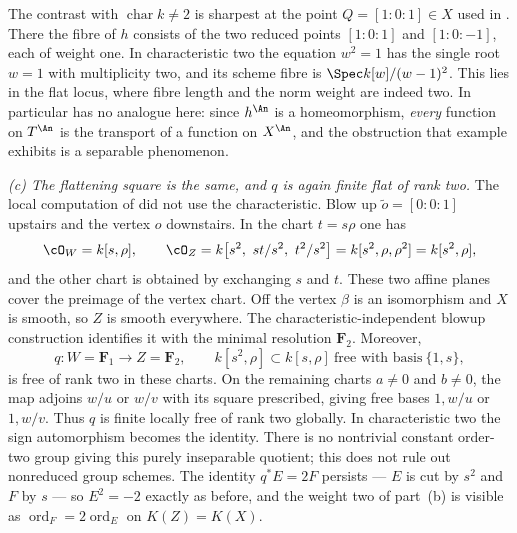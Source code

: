 \begin{example}
The contrast with $\operatorname{char}k\ne2$ is sharpest at the point
$Q=[1:0:1]\in X$ used in .  There the fibre
of $h$ consists of the two reduced points $[1:0:1]$ and $[1:0:-1]$,
each of weight one.  In characteristic two the equation $w^2=1$ has the
single root $w=1$ with multiplicity two, and its scheme fibre is
$\Spec k[w]/(w-1)^2$.  This lies in the flat locus, where fibre
length and the norm weight are indeed two.  In particular  has no analogue
here: since $h^{\An}$ is a homeomorphism, \emph{every} function on
$T^{\An}$ is the transport of a function on $X^{\An}$, and the
obstruction that example exhibits is a separable phenomenon.

\emph{(c) The flattening square is the same, and $q$ is again finite flat
of rank two.}
The local computation of  did not use the
characteristic.  Blow up $\tilde o=[0:0:1]$ upstairs and the vertex $o$
downstairs.  In the chart $t=s\rho$ one has
\[
 \cO_W=k[s,\rho],
 \qquad
 \cO_Z=k\bigl[s^2,\ st/s^2,\ t^2/s^2\bigr]=k[s^2,\rho,\rho^2]=k[s^2,\rho],
\]
and the other chart is obtained by exchanging $s$ and $t$.  These two affine planes cover the preimage of the vertex chart.
Off the vertex $\beta$ is an isomorphism and $X$ is smooth, so
$Z$ is smooth everywhere.  The characteristic-independent blowup
construction identifies it with the minimal resolution $\mathbf F_2$.
Moreover,
\[
 q:W=\mathbf F_1\longrightarrow Z=\mathbf F_2,
 \qquad
 k[s^2,\rho]\subset k[s,\rho]\ \text{free with basis}\ \{1,s\},
\]
is free of rank two in these charts.  On the remaining charts
$a\ne0$ and $b\ne0$, the map adjoins $w/u$ or $w/v$ with its
square prescribed, giving free bases $1,w/u$ or $1,w/v$.
Thus $q$ is finite locally free of rank two globally.
In characteristic two the sign automorphism becomes the identity.
There is no nontrivial constant order-two group giving this purely
inseparable quotient; this does not rule out nonreduced group schemes.  The identity $q^*E=2F$ persists --- $E$ is cut by $s^2$ and
$F$ by $s$ --- so $E^2=-2$ exactly as before, and the weight two of
part~(b) is visible as $\operatorname{ord}_F=2\operatorname{ord}_E$ on
$K(Z)=K(X)$.


\end{example}
